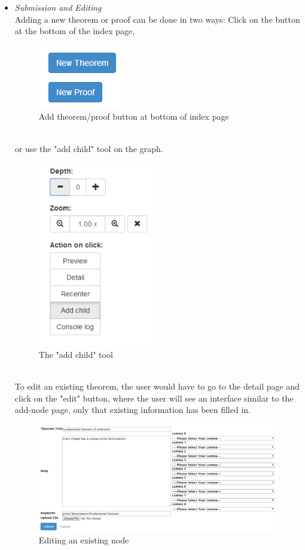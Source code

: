 \documentclass{acm_proc_article-sp}
\begin{document}
\begin{itemize}
\item \emph{Submission and Editing} \\
Adding a new theorem or proof can be done in two ways: 
Click on the button at the bottom of the index page,
\begin{figure}[h!]
\centering
\includegraphics[scale=0.8]{add_node.png}
\caption{Add theorem/proof button at bottom of index page}
\end{figure}\\
or use the "add child" tool on the graph. 
\begin{figure}[h!]
\centering
\includegraphics[scale=0.4]{add_child.png}
\caption{The "add child" tool}
\end{figure}\\
To edit an existing theorem, the user would have to go to the detail page and click on the "edit" button, where the user will see an interface similar to the add-node page, only that existing information has been filled in. 
\begin{figure}[h!]
\centering
\includegraphics[scale=0.4]{edit.png}
\caption{Editing an existing node}
\end{figure}\\


\end{itemize}
\end{document}
